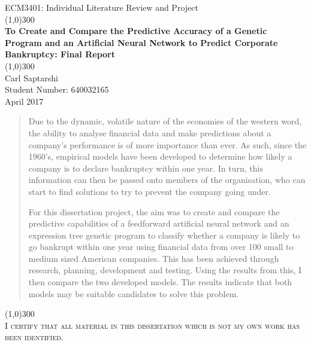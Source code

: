 \documentclass[11pt]{article}
\begin{document}
	\begin{titlepage}
		\begin{center}
		ECM3401: Individual Literature Review and Project\\
			\line(1,0){300}\\
			[0.25in]
			\huge{\bfseries To Create and Compare the Predictive Accuracy of a Genetic Program and an Artificial Neural Network to Predict Corporate Bankruptcy: Final Report}\\
			\line(1,0){300}\\
			[0.25in]
			 Carl Saptarshi\\
			 \large  Student Number: 640032165 \\
			 April 2017 \\
			 \null\vspace{\fill}
			 \begin{center}
			 \begin{abstract}\large
			 Due to the dynamic, volatile nature of the economies of the western word, the ability to analyse financial data and make predictions about a 			company's performance is of more importance than ever. As such, since the 1960's, empirical models have been developed to determine 			how likely a company is to declare bankruptcy within one year. In turn, this information can then be passed onto members of the 					organisation, who can start to find solutions to try to prevent the company going under. 

			For this dissertation project, the aim was to create and compare the predictive capabilities of a feedforward artificial neural network and an 			expression tree genetic program to classify whether a company is likely to go bankrupt within one year using financial data from over 100 			small to medium sized American companies. This has been achieved through research, planning, development and testing. Using the results 			from this, I then compare the two developed models. The results indicate that both models may be suitable candidates to solve this problem.
			 \end{abstract}
			 \end{center}
		
			 
		\end{center}
\begin{center}
\line(1,0){300}\\
[4cm]
\textsc{\large  I certify that all material in this dissertation which is not my own work has been identified.} \\
\end{center}
\end{titlepage}
\end{document}
